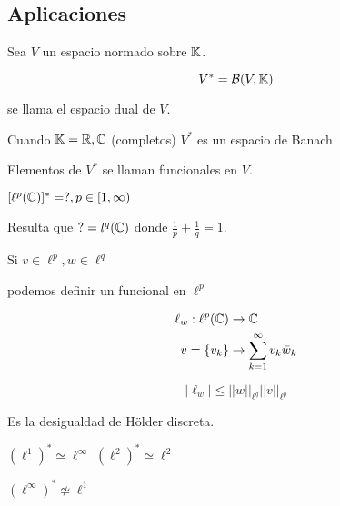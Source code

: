 \documentclass[../Apunte.tex]{subfiles}
\begin{document}
    \subsection{Aplicaciones}

    \begin{fdefinition}
        Sea $V$ un espacio normado sobre $\mathbb{K}$.

        \[V^*=\mathcal{B}(V,\mathbb{K})\]

        se llama el espacio \color{red} dual \color{black} de $V$.
    \end{fdefinition}

    \begin{ftheorem}
        Cuando $\mathbb{K}=\mathbb{R},\mathbb{C}$ (completos) $V^*$ es un espacio de Banach
    \end{ftheorem}

    Elementos de $V^*$ se llaman \color{red} funcionales \color{black} en $V$.


    \begin{fexample}
        $[\ell^p(\mathbb{C})]^* =?,p\in[1,\infty)$

        Resulta que $?=l^q(\mathbb{C})$ donde $\frac{1}{p}+\frac{1}{q}=1$.

        Si $v\in \ell^p,w\in\ell^q$

        podemos definir un funcional en $\ell^p$

        \begin{align*}\ell_w:\ell^p(\mathbb{C})&\to\mathbb{C}\\
        v=\{v_k\}&\to \sum_{k=1}^\infty v_k\bar w_k\end{align*}

        \[|\ell_w|\leq ||w||_{\ell^q}||v||_{\ell^p}\]

        Es la desigualdad de Hölder discreta.
    \end{fexample}

    $(\ell^1)^*\simeq \ell^\infty$
    $(\ell^2)^*\simeq \ell^2$

    \begin{fnote}
        $(\ell^\infty)^*\not\simeq \ell^1$
    \end{fnote}
\end{document}
